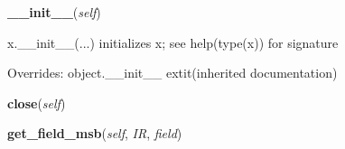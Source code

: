     \vspace{0.5ex}

\hspace{.8\funcindent}\begin{boxedminipage}{\funcwidth}

    \raggedright \textbf{\_\_init\_\_}(\textit{self})

\setlength{\parskip}{2ex}
    x.\_\_init\_\_(...) initializes x; see help(type(x)) for signature

\setlength{\parskip}{1ex}
      Overrides: object.\_\_init\_\_ 	extit{(inherited documentation)}

    \end{boxedminipage}

    \label{hpl_tap_spf_api:HplTapSpfApi:close}

    \vspace{0.5ex}

\hspace{.8\funcindent}\begin{boxedminipage}{\funcwidth}

    \raggedright \textbf{close}(\textit{self})

\setlength{\parskip}{2ex}
\setlength{\parskip}{1ex}
    \end{boxedminipage}

    \label{hpl_tap_spf_api:HplTapSpfApi:get_field_msb}

    \vspace{0.5ex}

\hspace{.8\funcindent}\begin{boxedminipage}{\funcwidth}

    \raggedright \textbf{get\_field\_msb}(\textit{self}, \textit{IR}, \textit{field})

\setlength{\parskip}{2ex}
\setlength{\parskip}{1ex}
    \end{boxedminipage}

    \label{hpl_tap_spf_api:HplTapSpfApi:get_field_lsb}

    \vspace{0.5ex}


